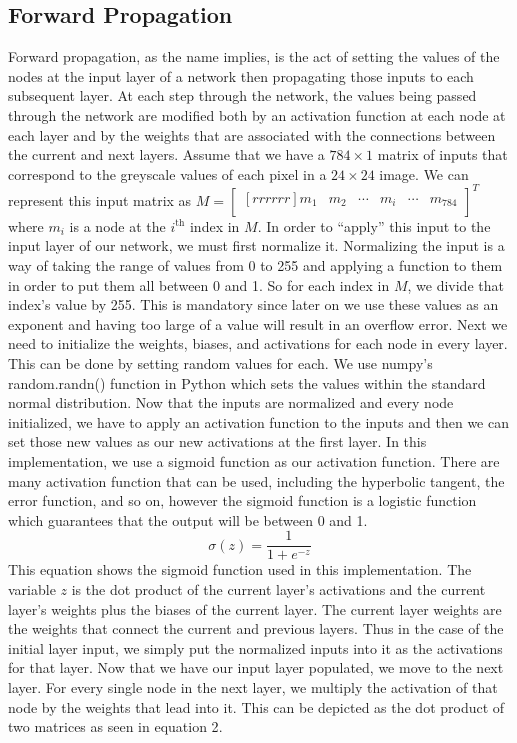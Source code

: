 \documentclass[12pt]{article}
\theoremstyle{definition}
\theoremstyle{plain}
\begin{document}
\subsection{Forward Propagation}
Forward propagation, as the name implies, is the act of setting the values of the nodes at the input layer of a network then propagating those inputs to each subsequent layer. At each step through the network, the values being passed through the network are modified both by an activation function at each node at each layer and by the weights that are associated with the connections between the current and next layers. Assume that we have a $784\times 1$ matrix of inputs that correspond to the greyscale values of each pixel in a $24\times 24$ image. We can represent this input matrix as $M = \begin{bmatrix}[rrrrrr]m_1&m_2&\cdots&m_i&\cdots&m_{784}\\\end{bmatrix}^T$ where $m_i$ is a node at the $i^{\mathrm{th}}$ index in $M$. In order to ``apply'' this input to the input layer of our network, we must first normalize it. Normalizing the input is a way of taking the range of values from 0 to 255 and applying a function to them in order to put them all between 0 and 1. So for each index in $M$, we divide that index's value by 255. This is mandatory since later on we use these values as an exponent and having too large of a value will result in an overflow error. Next we need to initialize the weights, biases, and activations for each node in every layer. This can be done by setting random values for each. We use numpy's random.randn() function in Python which sets the values within the standard normal distribution. Now that the inputs are normalized and every node initialized, we have to apply an activation function to the inputs and then we can set those new values as our new activations at the first layer. In this implementation, we use a sigmoid function as our activation function. There are many activation function that can be used, including the hyperbolic tangent, the error function, and so on, however the sigmoid function is a logistic function which guarantees that the output will be between 0 and 1.
\begin{equation}\label{eqn:Sigmoid}
\sigma(z) = \dfrac{1}{1+e^{-z}}
\end{equation}
This equation shows the sigmoid function used in this implementation. The variable $z$ is the dot product of the current layer's activations and the current layer's weights plus the biases of the current layer. The current layer weights are the weights that connect the current and previous layers. Thus in the case of the initial layer input, we simply put the normalized inputs into it as the activations for that layer. Now that we have our input layer populated, we move to the next layer. For every single node in the next layer, we multiply the activation of that node by the weights that lead into it. This can be depicted as the dot product of two matrices as seen in equation 2\cite{nielsen_2017}.
\end{document}
